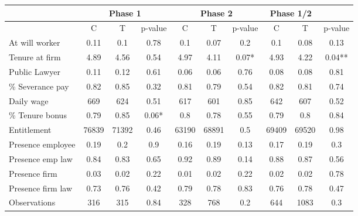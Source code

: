 \begin{tabular}{lccccccccc}
\toprule
      & \multicolumn{3}{c}{Phase 1} & \multicolumn{3}{c}{Phase 2} & \multicolumn{2}{c}{Phase 1/2} &  \\
\midrule
\midrule
      & C     & T     & p-value & C     & T     & p-value & C     & T     & p-value \\
\midrule
\midrule
At will worker & 0.11  & 0.1   & 0.78  & 0.1   & 0.07  & 0.2   & 0.1   & 0.08  & 0.13 \\
Tenure at firm & 4.89  & 4.56  & 0.54  & 4.97  & 4.11  & 0.07* & 4.93  & 4.22  & 0.04** \\
Public Lawyer & 0.11  & 0.12  & 0.61  & 0.06  & 0.06  & 0.76  & 0.08  & 0.08  & 0.81 \\
\% Severance pay & 0.82  & 0.85  & 0.32  & 0.81  & 0.79  & 0.54  & 0.82  & 0.81  & 0.74 \\
Daily wage & 669   & 624   & 0.51  & 617   & 601   & 0.85  & 642   & 607   & 0.52 \\
\% Tenure bonus & 0.79  & 0.85  & 0.06* & 0.8   & 0.78  & 0.55  & 0.79  & 0.8   & 0.84 \\
Entitlement & 76839 & 71392 & 0.46  & 63190 & 68891 & 0.5   & 69409 & 69520 & 0.98 \\
Presence employee & 0.19  & 0.2   & 0.9   & 0.16  & 0.19  & 0.13  & 0.17  & 0.19  & 0.3 \\
Presence emp law & 0.84  & 0.83  & 0.65  & 0.92  & 0.89  & 0.14  & 0.88  & 0.87  & 0.56 \\
Presence firm & 0.03  & 0.02  & 0.22  & 0.01  & 0.02  & 0.22  & 0.02  & 0.02  & 0.78 \\
Presence firm law & 0.73  & 0.76  & 0.42  & 0.79  & 0.78  & 0.83  & 0.76  & 0.78  & 0.47 \\
\midrule
\midrule
Observations & 316   & 315   & 0.84  & 328   & 768   & 0.2   & 644   & 1083  & 0.3 \\
\bottomrule
\end{tabular}%
